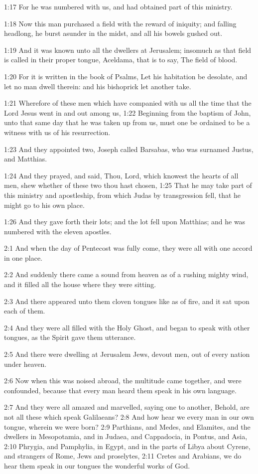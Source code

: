 1:17 For he was numbered with us, and had obtained part of this
ministry.

1:18 Now this man purchased a field with the reward of iniquity; and
falling headlong, he burst asunder in the midst, and all his bowels
gushed out.

1:19 And it was known unto all the dwellers at Jerusalem; insomuch as
that field is called in their proper tongue, Aceldama, that is to say,
The field of blood.

1:20 For it is written in the book of Psalms, Let his habitation be
desolate, and let no man dwell therein: and his bishoprick let another
take.

1:21 Wherefore of these men which have companied with us all the time
that the Lord Jesus went in and out among us, 1:22 Beginning from the
baptism of John, unto that same day that he was taken up from us, must
one be ordained to be a witness with us of his resurrection.

1:23 And they appointed two, Joseph called Barsabas, who was surnamed
Justus, and Matthias.

1:24 And they prayed, and said, Thou, Lord, which knowest the hearts
of all men, shew whether of these two thou hast chosen, 1:25 That he
may take part of this ministry and apostleship, from which Judas by
transgression fell, that he might go to his own place.

1:26 And they gave forth their lots; and the lot fell upon Matthias;
and he was numbered with the eleven apostles.

2:1 And when the day of Pentecost was fully come, they were all with
one accord in one place.

2:2 And suddenly there came a sound from heaven as of a rushing mighty
wind, and it filled all the house where they were sitting.

2:3 And there appeared unto them cloven tongues like as of fire, and
it sat upon each of them.

2:4 And they were all filled with the Holy Ghost, and began to speak
with other tongues, as the Spirit gave them utterance.

2:5 And there were dwelling at Jerusalem Jews, devout men, out of
every nation under heaven.

2:6 Now when this was noised abroad, the multitude came together, and
were confounded, because that every man heard them speak in his own
language.

2:7 And they were all amazed and marvelled, saying one to another,
Behold, are not all these which speak Galilaeans?  2:8 And how hear we
every man in our own tongue, wherein we were born?  2:9 Parthians, and
Medes, and Elamites, and the dwellers in Mesopotamia, and in Judaea,
and Cappadocia, in Pontus, and Asia, 2:10 Phrygia, and Pamphylia, in
Egypt, and in the parts of Libya about Cyrene, and strangers of Rome,
Jews and proselytes, 2:11 Cretes and Arabians, we do hear them speak
in our tongues the wonderful works of God.

